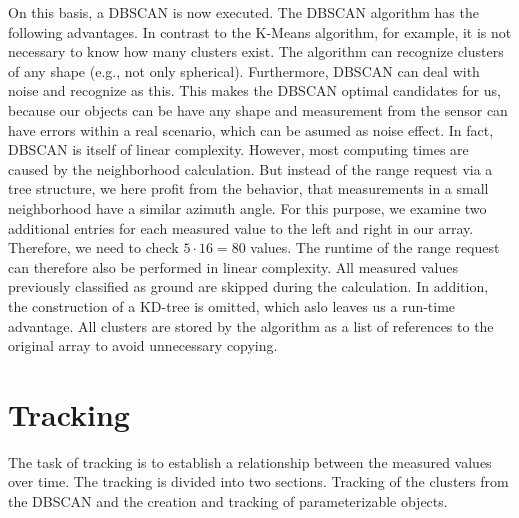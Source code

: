 \documentclass[11pt,oneside,openright]{mpreport}
\begin{document}
On this basis, a \ac{DBSCAN} \cite{DBSCAN} is now executed. The \ac{DBSCAN} algorithm has the following advantages. In contrast to the K-Means algorithm,
for example, it is not necessary to know how many clusters exist. The algorithm can recognize clusters of any shape (e.g., not only spherical).
Furthermore, \ac{DBSCAN} can deal with noise and recognize as this. This makes the \ac{DBSCAN} optimal candidates for us, because our objects can be have any shape and 
measurement from the sensor can have errors within a real scenario, which can be asumed as noise effect. 
In fact, \ac{DBSCAN} is itself of linear complexity. However, most computing times are caused by the neighborhood calculation.
But instead of the range request via a tree structure, we here profit from the behavior, that measurements in a small neighborhood have a similar azimuth angle.
For this purpose, we examine two additional entries for each measured value to the left and right in our array. 
Therefore, we need to check $5 \cdot 16 = 80$ values. The runtime of the range request can therefore also be performed in linear complexity. 
All measured values previously classified as ground are skipped during the calculation. In addition, the construction of a KD-tree is omitted, which aslo leaves us a run-time advantage.
All clusters are stored by the algorithm as a list of references to the original array to avoid unnecessary copying.


\section{Tracking}
\label{tracking}
The task of tracking is to establish a relationship between the measured values over time. The tracking is divided into two sections.
Tracking of the clusters from the \ac{DBSCAN} and the creation and tracking of parameterizable objects.
\end{document}
